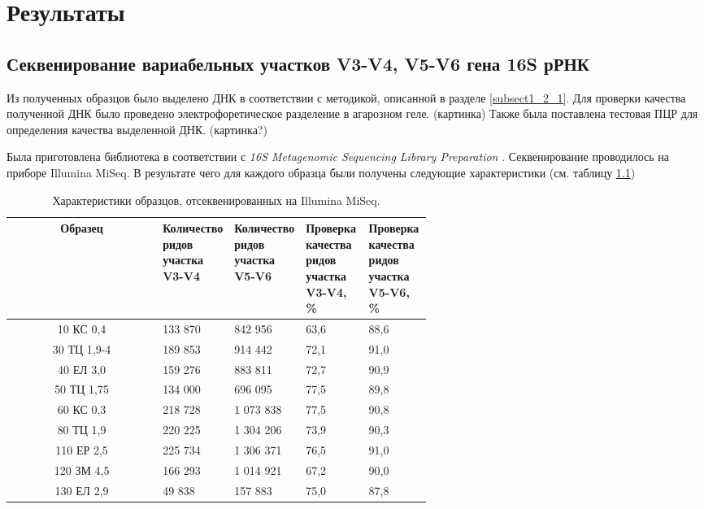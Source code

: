 \chapter{Результаты} \label{chapt2}

\section{Секвенирование вариабельных участков V3-V4, V5-V6 гена 16S рРНК} \label{sect2_1}


Из полученных образцов было выделено ДНК в соответствии с методикой, описанной в разделе \ref{subsect1_2_1}. Для проверки качества полученной ДНК было проведено электрофоретическое разделение в агарозном геле. (картинка) Также была поставлена тестовая ПЦР для определения качества выделенной ДНК. (картинка?) 

Была приготовлена библиотека в соответствии с \textit{16S Metagenomic Sequencing Library Preparation }. Секвенирование проводилось на приборе Illumina MiSeq. В результате чего для каждого образца были получены следующие характеристики (см. таблицу \ref{tab:16Sread_Ill_characteristic})

\begin{table}[H]
\caption{Характеристики образцов, отсеквенированных на Illumina MiSeq.}\label{tab:16Sread_Ill_characteristic}
\begin{center}
\begin{tabular}{|c|p{0.15\linewidth}|p{0.15\linewidth}|p{0.15\linewidth}|p{0.15\linewidth}|}
\hline
Образец & Количество ридов участка V3-V4 & Количество ридов участка V5-V6 & Проверка качества ридов участка V3-V4, \% & Проверка качества ридов участка V5-V6, \% \\
\hline
10 КС 0,4 &                                                                                                                                                                                                                                                                                                                                                                                                                                                                                                                                                                        133 870 & 842 956 & 63,6 & 88,6  \\
30 ТЦ 1,9-4 & 189 853 & 914 442 & 72,1  & 91,0  \\
40 ЕЛ 3,0 & 159 276 & 883 811 & 72,7  & 90,9  \\
50 ТЦ 1,75 & 134 000 & 696 095 & 77,5  & 89,8  \\
60 КС 0,3 & 218 728 & 1 073 838 & 77,5  & 90,8  \\
80 ТЦ 1,9 & 220 225 & 1 304 206 & 73,9  & 90,3  \\
110 ЕР 2,5 & 225 734 & 1 306 371 & 76,5  & 91,0  \\
120 ЗМ 4,5 & 166 293 & 1 014 921 & 67,2  & 90,0  \\
130 ЕЛ 2,9 & 49 838 & 157 883 & 75,0  & 87,8  \\
\hline
\end{tabular}
\end{center}
\end{table}

